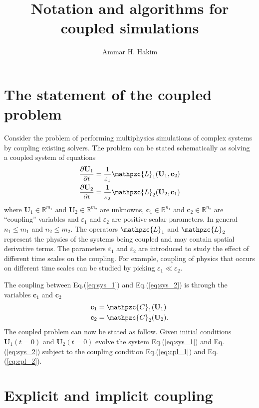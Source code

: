 \documentclass[11pt, reqno]{amsart}
\title{Notation and algorithms for coupled simulations}%
\author{Ammar H. Hakim}%
\date{}
\newcommand{\eqr}[1]{Eq.\thinspace(#1)}
\newcommand{\pfrac}[2]{\frac{\partial #1}{\partial #2}}
\newcommand{\mvec}[1]{\mathbf{#1}}
\newcommand{\script}[1]{\mathpzc{#1}}
\theoremstyle{definition}
\begin{document}
\maketitle

\section{The statement of the coupled problem}

Consider the problem of performing multiphysics simulations of complex
systems by coupling existing solvers. The problem can be stated
schematically as solving a coupled system of equations
\begin{align}
  \pfrac{\mvec{U}_1}{t} &= \frac{1}{\varepsilon_1}
  \script{L}_1(\mvec{U}_1, \mvec{c}_2) \label{eq:sys_1} \\
  \pfrac{\mvec{U}_2}{t} &= \frac{1}{\varepsilon_2}
  \script{L}_2(\mvec{U}_2, \mvec{c}_1) \label{eq:sys_2}
\end{align}
where $\mvec{U}_1 \in \mathbb{R}^{m_1}$ and $\mvec{U}_2 \in
\mathbb{R}^{m_2}$ are unknowns, $\mvec{c}_1 \in \mathbb{R}^{n_1}$ and
$\mvec{c}_2 \in \mathbb{R}^{n_2}$ are ``coupling'' variables and
$\varepsilon_1$ and $\varepsilon_2$ are positive scalar parameters. In
general $n_1\le m_1$ and $n_2\le m_2$. The operators $\script{L}_1$
and $\script{L}_2$ represent the physics of the systems being coupled
and may contain spatial derivative terms. The parameters
$\varepsilon_1$ and $\varepsilon_2$ are introduced to study the effect
of different time scales on the coupling. For example, coupling of
physics that occurs on different time scales can be studied by picking
$\varepsilon_1 \ll \varepsilon_2$.

The coupling between \eqr{\ref{eq:sys_1}} and \eqr{\ref{eq:sys_2}} is
through the variables $\mvec{c}_1$ and $\mvec{c}_2$
\begin{align}
  \mvec{c}_1 &= \script{C}_1(\mvec{U}_1) \label{eq:cpl_1} \\
  \mvec{c}_2 &= \script{C}_2(\mvec{U}_2). \label{eq:cpl_2}
\end{align}
The coupled problem can now be stated as follow. Given initial
conditions $\mvec{U}_1(t=0)$ and $\mvec{U}_2(t=0)$ evolve the system
\eqr{\ref{eq:sys_1}} and \eqr{\ref{eq:sys_2}} subject to the coupling
condition \eqr{\ref{eq:cpl_1}} and \eqr{\ref{eq:cpl_2}}.

\section{Explicit and implicit coupling}
\end{document}
